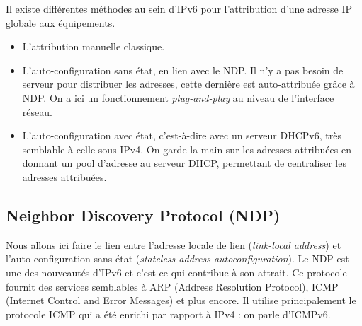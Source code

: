 Il existe différentes méthodes au sein d'IPv6 pour l’attribution d’une adresse IP globale aux équipements.

\begin{itemize}
  \item L'attribution manuelle classique.
  \item L’auto-configuration sans état, en lien avec le NDP.
Il n’y a pas besoin de serveur pour distribuer les adresses, cette dernière est auto-attribuée grâce à NDP.
On a ici un fonctionnement \emph{plug-and-play} au niveau de l’interface réseau.
  \item L’auto-configuration avec état, c’est-à-dire avec un serveur DHCPv6, très semblable à celle sous IPv4.
On garde la main sur les adresses attribuées en donnant un pool d’adresse au serveur DHCP, permettant de centraliser les adresses attribuées.
\end{itemize}

\subsection{Neighbor Discovery Protocol (NDP)}

Nous allons ici faire le lien entre l’adresse locale de lien (\textit{link-local address}) et l’auto-configuration sans état (\textit{stateless address autoconfiguration}).
Le NDP est une des nouveautés d’IPv6 et c’est ce qui contribue à son attrait.
Ce protocole fournit des services semblables à ARP (Address Resolution Protocol), ICMP (Internet Control and Error Messages) et plus encore.
Il utilise principalement le protocole ICMP qui a été enrichi par rapport à IPv4 : on parle d’ICMPv6.

